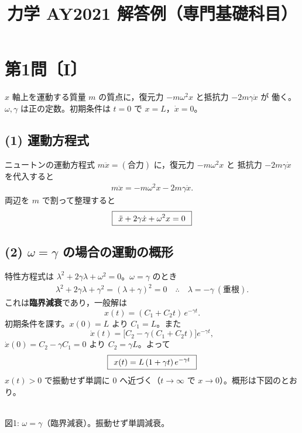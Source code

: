\documentclass[11pt,a4paper]{article}
\title{力学 AY2021 解答例（専門基礎科目）}
\author{}
\date{}
\begin{document}
\maketitle

\section*{第1問〔I〕}

$x$ 軸上を運動する質量 $m$ の質点に，復元力 $-m\omega^2 x$ と抵抗力 $-2m\gamma\dot{x}$ が
働く。$\omega,\gamma$ は正の定数。初期条件は $t=0$ で $x=L$，$\dot{x}=0$。

\subsection*{(1) 運動方程式}
ニュートンの運動方程式 $m\ddot{x}=(\text{合力})$ に，復元力 $-m\omega^2 x$ と
抵抗力 $-2m\gamma\dot{x}$ を代入すると
\begin{align*}
  m\ddot{x} = -m\omega^2 x - 2m\gamma\dot{x}.
\end{align*}
両辺を $m$ で割って整理すると
\[
  \boxed{\,\;\ddot{x}+2\gamma\dot{x}+\omega^2 x = 0\;\,}
\]

\subsection*{(2) $\omega=\gamma$ の場合の運動の概形}
特性方程式は $\lambda^2+2\gamma\lambda+\omega^2=0$。$\omega=\gamma$ のとき
\begin{align*}
  \lambda^2+2\gamma\lambda+\gamma^2=(\lambda+\gamma)^2=0
  \quad\therefore\quad \lambda=-\gamma\ (\text{重根}).
\end{align*}
これは\textbf{臨界減衰}であり，一般解は
\[
  x(t)=(C_1+C_2 t)\,e^{-\gamma t}.
\]
初期条件を課す。$x(0)=L$ より $C_1=L$。また
\[
  \dot{x}(t)=\bigl[C_2-\gamma(C_1+C_2 t)\bigr]e^{-\gamma t},
\]
$\dot{x}(0)=C_2-\gamma C_1=0$ より $C_2=\gamma L$。よって
\[
  \boxed{\,\;x(t)=L\,(1+\gamma t)\,e^{-\gamma t}\;\,}
\]
$x(t)>0$ で振動せず単調に $0$ へ近づく（$t\to\infty$ で $x\to0$）。概形は下図のとおり。

\begin{center}
\\
{\small 図1: $\omega=\gamma$（臨界減衰）。振動せず単調減衰。}
\end{center}
\end{document}
